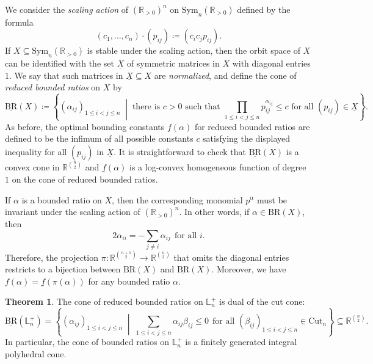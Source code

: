 \documentclass{amsart}
\theoremstyle{definition}
\newtheorem{mainthm}{Theorem}
\theoremstyle{remark}
\def\RR{\mathbb{R}}
\def\L{\mathbb{L}}
\def\BR{\mathrm{BR}}
\def\Sym{\mathrm{Sym}}
\def\Cut{\mathrm{Cut}}
\begin{document}
We consider the \emph{scaling action} of 
$(\RR_{>0})^n$ on $\Sym_n(\RR_{> 0})$ defined by the formula
\[
	(c_1,\dots, c_n)\cdot (p_{ij}) \coloneqq (c_ic_jp_{ij}).
    \]
If $X\subseteq \Sym_n(\RR_{>0})$ is stable under the scaling action, then the orbit space of $X$ can be identified with the set $\underline{X}$ of symmetric matrices in $X$ with diagonal entries $1$.
We say that such matrices in $\underline{X} \subseteq X$ are \emph{normalized}, and define the cone of  \emph{reduced bounded ratios} on $X$ by 
\[
\underline{\BR}(X)
\coloneqq
\left\{ 
(\alpha_{ij})_{1 \le i<j \le n} \;\middle|\; \text{there is $c>0$ such that  $\prod_{1\le i< j\le n}p_{ij}^{\alpha_{ij}}\le c$ for all $(p_{ij}) \in \underline{X}$}   \right\}.
\]
As before, the optimal bounding constants $\underline{f}(\alpha)$ for reduced bounded ratios are defined to be the infimum of all possible constants $c$ satisfying the displayed inequality for all $(p_{ij})$ in $\underline{X}$.
It is straightforward to check that $\underline{\BR}(X)$ is a convex cone in $\RR^{\binom{n}{2}}$ and $\underline{f}(\alpha)$ is a log-convex homogeneous function of degree $1$ on the cone of reduced bounded ratios. 


If $\alpha$ is a bounded ratio on $X$, then the corresponding monomial $p^\alpha$
must be invariant under the scaling action of $(\RR_{>0})^n$. 
In other words, if $\alpha\in\BR(X)$, then 
\[
2\alpha_{ii}=-\sum_{j\neq i}\alpha_{ij} \ \ \text{for all $i$}.
\]
Therefore, the projection $\pi: \RR^{\binom{n+1}{2}} \to \RR^{\binom{n}{2}}$ that omits the diagonal entries restricts to a bijection between $\BR(X)$ and $\underline{\BR}(X)$. Moreover,  we have $f(\alpha)=\underline{f}(\pi(\alpha))$ for any bounded ratio $\alpha$.



\renewcommand{\themainthm}{B}
\begin{mainthm}%
\label{mth:BR}
	The cone of reduced bounded ratios on $\L_n^+$ is %
     dual of the cut cone:
	\[
    \underline{\BR}(\L_n^+)=\left\{(\alpha_{ij})_{1 \le i < j\le n} \;\middle|\; \sum_{1 \le i<j \le n} \alpha_{ij} \beta_{ij} \le 0 \ \ \text{for all $(\beta_{ij})_{1 \le i<j \le n} \in \Cut_n$} \right\} \subseteq \RR^{\binom{n}{2}}.
    \]
In particular, the cone of bounded ratios on $\L_n^+$ is a  finitely generated integral polyhedral cone.
\end{mainthm}
\end{document}
